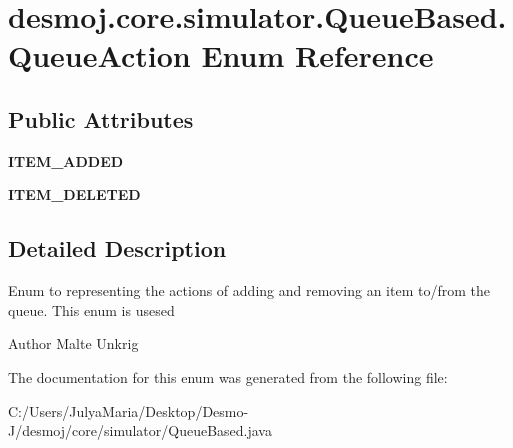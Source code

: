 \section{desmoj.\-core.\-simulator.\-Queue\-Based.\-Queue\-Action Enum Reference}
\label{enumdesmoj_1_1core_1_1simulator_1_1_queue_based_1_1_queue_action}
\subsection*{Public Attributes}
\begin{DoxyCompactItemize}
\item 
{\bfseries I\-T\-E\-M\-\_\-\-A\-D\-D\-E\-D}\label{enumdesmoj_1_1core_1_1simulator_1_1_queue_based_1_1_queue_action_a5f7871da5fb103cd0a63fd748a0e5f06}

\item 
{\bfseries I\-T\-E\-M\-\_\-\-D\-E\-L\-E\-T\-E\-D}\label{enumdesmoj_1_1core_1_1simulator_1_1_queue_based_1_1_queue_action_a15223928f5fc7a1f91b5f3ebacc3c828}

\end{DoxyCompactItemize}


\subsection{Detailed Description}
Enum to representing the actions of adding and removing an item to/from the queue. This enum is usesed

\begin{DoxyAuthor}{Author}
Malte Unkrig 
\end{DoxyAuthor}


The documentation for this enum was generated from the following file\-:\begin{DoxyCompactItemize}
\item 
C\-:/\-Users/\-Julya\-Maria/\-Desktop/\-Desmo-\/\-J/desmoj/core/simulator/Queue\-Based.\-java\end{DoxyCompactItemize}
